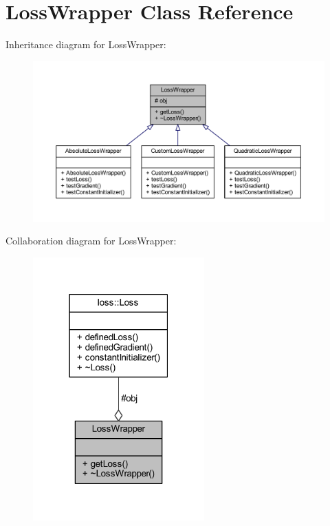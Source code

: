\hypertarget{class_loss_wrapper}{}\section{Loss\+Wrapper Class Reference}
\label{class_loss_wrapper}


Inheritance diagram for Loss\+Wrapper\+:\nopagebreak
\begin{figure}[H]
\begin{center}
\leavevmode
\includegraphics[width=350pt]{class_loss_wrapper__inherit__graph}
\end{center}
\end{figure}


Collaboration diagram for Loss\+Wrapper\+:\nopagebreak
\begin{figure}[H]
\begin{center}
\leavevmode
\includegraphics[width=187pt]{class_loss_wrapper__coll__graph}
\end{center}
\end{figure}
